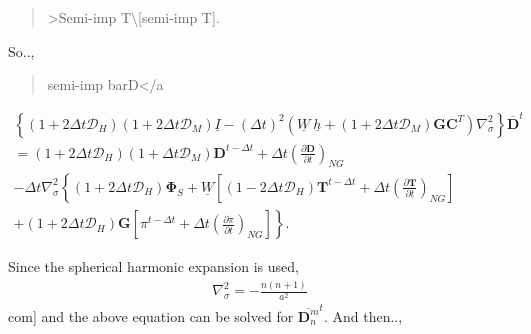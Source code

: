 \begin{quote}
\protect\hypertarget{semi-impux20T}{}{ \textgreater Semi-imp
T\textbackslash{[}semi-imp T{]}}.
\end{quote}

So..,

\begin{quote}
\protect\hypertarget{semi-impux20barD}{}{\blank{[}semi-imp
barD\blank{]}}\textless/a
\end{quote}

\begin{eqnarray}
      \left\{ ( 1+2\Delta t {\mathcal D}_H )( 1+2\Delta t {\mathcal D}_M )
           \underline{I}  
      - ( \Delta t )^{2}  ( \underline{W} \ \underline{h}
           + (1+2\Delta t {\mathcal D}_M)
             \mathbf{G} \mathbf{C}^{T} ) \nabla^{2}_{\sigma}
  \right\}
      \overline{ \mathbf{D} }^{t}
       \\
  = ( 1+2\Delta t {\mathcal D}_H )( 1+\Delta t {\mathcal D}_M )
       \mathbf{D}^{t-\Delta t}
  + \Delta t
     \left( \frac{\partial \mathbf{D}}{\partial t} \right)_{NG}  
  \\
  -  \Delta t \nabla^{2}_{\sigma}     
                   \left\{  ( 1+2\Delta t {\mathcal D}_H ) \mathbf{\Phi}_{S}
                          + \underline{W}
                            \left[ ( 1-2\Delta t {\mathcal D}_H )
                                    \mathbf{T}^{t-\Delta t}
                                  + \Delta t
                                      \left( \frac{\partial \mathbf{T}}
                                                  {\partial t}     
                                      \right)_{NG} \right]
                   \right.
  \\
                 \left.   
                          + ( 1+2\Delta t {\mathcal D}_H ) \mathbf{G}
                            \left[ \pi^{t-\Delta t}
                                  + \Delta t
                                     \left( \frac{\partial \pi}
                                                 {\partial t}
                                     \right)_{NG}  \right]
                   \right\} .
\end{eqnarray}

Since the spherical harmonic expansion is used, \begin{eqnarray}
    \nabla^{2}_{\sigma} = - \frac{n(n+1)}{a^{2}}
\end{eqnarray} com{]} and the above equation can be solved for
\(\overline{ \mathbf{D}_n^m }^{t}\). And then..,

